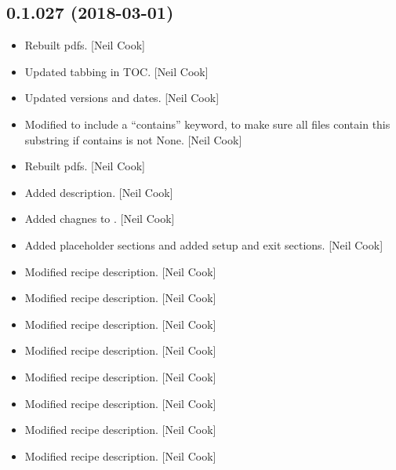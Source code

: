 \documentclass[a4paper,10pt,english]{report}
\begin{document}
\subsection{0.1.027 (2018-03-01)}
\label{\detokenize{misc/changelog:id476}}\begin{itemize}
\item {} 
Rebuilt pdfs. {[}Neil Cook{]}

\item {} 
Updated tabbing in TOC. {[}Neil Cook{]}

\item {} 
Updated versions and dates. {[}Neil Cook{]}

\item {} 
Modified  to include a “contains” keyword, to make
sure all files  contain this substring if contains is
not None. {[}Neil Cook{]}

\item {} 
Rebuilt pdfs. {[}Neil Cook{]}

\item {} 
Added description. {[}Neil Cook{]}

\item {} 
Added chagnes to . {[}Neil Cook{]}

\item {} 
Added placeholder sections and added setup and exit sections. {[}Neil
Cook{]}

\item {} 
Modified recipe description. {[}Neil Cook{]}

\item {} 
Modified recipe description. {[}Neil Cook{]}

\item {} 
Modified recipe description. {[}Neil Cook{]}

\item {} 
Modified recipe description. {[}Neil Cook{]}

\item {} 
Modified recipe description. {[}Neil Cook{]}

\item {} 
Modified recipe description. {[}Neil Cook{]}

\item {} 
Modified recipe description. {[}Neil Cook{]}

\item {} 
Modified recipe description. {[}Neil Cook{]}


\end{itemize}
\end{document}
